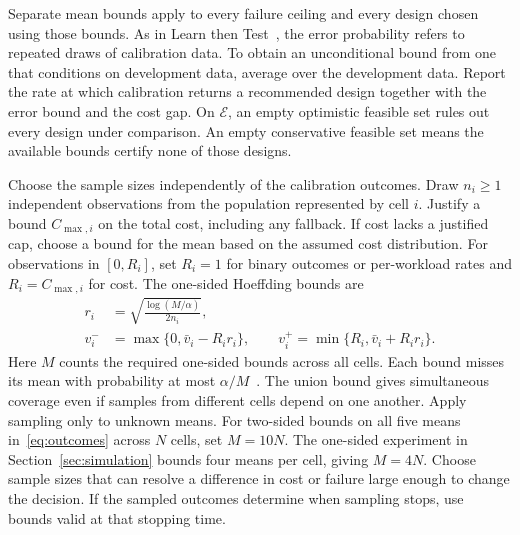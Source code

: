 \documentclass[11pt,reqno]{amsart}
\theoremstyle{definition}
\theoremstyle{remark}
\begin{document}
Separate mean bounds apply to every failure ceiling and every design chosen using those bounds. As in Learn then Test~\cite{ltt}, the error probability refers to repeated draws of calibration data. To obtain an unconditional bound from one that conditions on development data, average over the development data. Report the rate at which calibration returns a recommended design together with the error bound and the cost gap. On $\mathcal E$, an empty optimistic feasible set rules out every design under comparison. An empty conservative feasible set means the available bounds certify none of those designs.

Choose the sample sizes independently of the calibration outcomes. Draw $n_i\ge1$ independent observations from the population represented by cell $i$. Justify a bound $C_{\max,i}$ on the total cost, including any fallback. If cost lacks a justified cap, choose a bound for the mean based on the assumed cost distribution. For observations in $[0,R_i]$, set $R_i=1$ for binary outcomes or per-workload rates and $R_i=C_{\max,i}$ for cost. The one-sided Hoeffding bounds are
\begin{equation}
 \begin{aligned}
 r_i&=\sqrt{\frac{\log(M/\alpha)}{2n_i}},\\
 v_i^-&=\max\{0,\bar v_i-R_i r_i\},\qquad
 v_i^+=\min\{R_i,\bar v_i+R_i r_i\}.
 \end{aligned}
 \label{eq:hoeffding}
\end{equation}
Here $M$ counts the required one-sided bounds across all cells. Each bound misses its mean with probability at most $\alpha/M$~\cite{hoeffding}. The union bound gives simultaneous coverage even if samples from different cells depend on one another. Apply sampling only to unknown means. For two-sided bounds on all five means in~\eqref{eq:outcomes} across $N$ cells, set $M=10N$. The one-sided experiment in Section~\ref{sec:simulation} bounds four means per cell, giving $M=4N$.
Choose sample sizes that can resolve a difference in cost or failure large enough to change the decision. If the sampled outcomes determine when sampling stops, use bounds valid at that stopping time.
\end{document}
